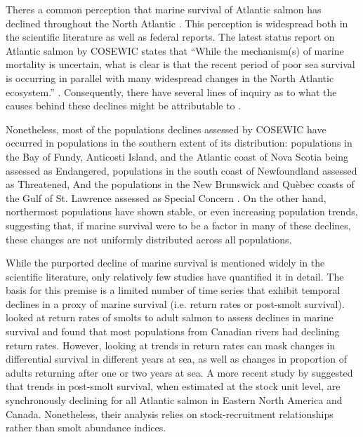 \documentclass[12pt]{article}
\begin{document}
Theres a common perception that marine survival of Atlantic salmon has
declined throughout the North Atlantic \citep{OMaoileidigh2003, Hansen1998,
    Chaput2012a}. This perception is widespread both in the scientific
literature as well as federal reports. The latest status report on Atlantic
salmon by COSEWIC states that ``While the mechanism(s) of marine mortality is
uncertain, what is clear is that the recent period of poor sea survival is
occurring in parallel with many widespread changes in the North Atlantic
ecosystem.'' \citep{Cosewic2010}. Consequently, there have several lines of
inquiry as to what the causes behind these declines might be attributable to
\citep{Friedland1993, Friedland1998}.

Nonetheless, most of the populations declines assessed by COSEWIC have
occurred in populations in the southern extent of its distribution:
populations in the Bay of Fundy, Anticosti Island, and the Atlantic coast of
Nova Scotia being assessed as Endangered, populations in the south coast of
Newfoundland assessed as Threatened, And the populations in the New Brunswick
and Qu\`{e}bec coasts of the Gulf of St. Lawrence assessed as Special Concern
\citep{Cosewic2010}. On the other hand, northermost populations have shown
stable, or even increasing population trends, suggesting that, if marine
survival were to be a factor in many of these declines, these changes are not
uniformly distributed across all populations.

While the purported decline of marine survival is mentioned widely in the 
scientific literature, only relatively few studies have quantified it in detail.
The basis for this premise is a limited number of time series that exhibit
temporal declines in a proxy of marine survival (i.e. return rates or
post-smolt survival).
\citet{Chaput2012a} looked at return rates of smolts to adult salmon to assess
declines in marine survival and found that most populations from Canadian
rivers had declining return rates. 
However, looking at trends in return rates
can mask changes in differential survival in different years at sea, as well
as changes in proportion of adults returning after one or two years at sea.
A more recent study by \citet{Olmos2019} suggested that trends in post-smolt
survival, when estimated at the stock unit level, are synchronously declining
for all Atlantic salmon in Eastern North America and Canada. Nonetheless,
their analysis relies on stock-recruitment relationships rather than smolt
abundance indices.
\end{document}
